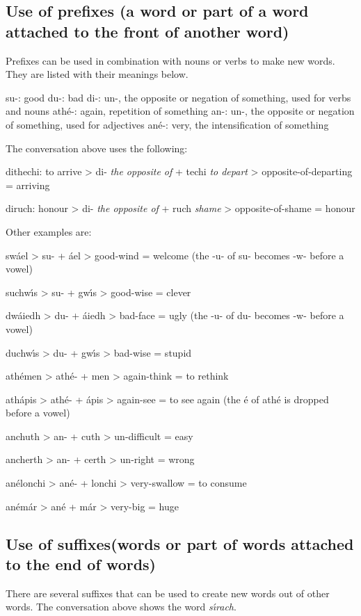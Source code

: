 \subsection{Use of prefixes (a word or part of a word attached to the front of another word)}

Prefixes can be used in combination with nouns or verbs to make new words. They are listed with their meanings below.

su-: good
du-: bad
di-: un-, the opposite or negation of something, used for verbs and nouns
ath\'{e}-: again, repetition of something
an-: un-, the opposite or negation of something, used for adjectives
an\'{e}-: very, the intensification of something

The conversation above uses the following:

dithechi: to arrive
> di- \textit{the opposite of} + techi \textit{to depart} > opposite-of-departing = arriving

diruch: honour
> di- \textit{the opposite of} + ruch \textit{shame} > opposite-of-shame = honour

Other examples are:

sw\'{a}el
> su- + \'{a}el > good-wind = welcome (the -u- of su- becomes -w- before a vowel)

suchw\'{\i}s
> su- + gw\'{\i}s > good-wise = clever

dw\'{a}iedh
> du- + \'{a}iedh > bad-face = ugly (the -u- of du- becomes -w- before a vowel)

duchw\'{\i}s
> du- + gw\'{\i}s > bad-wise = stupid

ath\'{e}men
> ath\'{e}- + men > again-think = to rethink

ath\'{a}pis
> ath\'{e}- + \'{a}pis > again-see = to see again (the \'{e} of ath\'{e} is dropped before a vowel)

anchuth
> an- + cuth > un-difficult = easy

ancherth
> an- + certh > un-right = wrong

an\'{e}lonchi
> an\'{e}- + lonchi > very-swallow = to consume

an\'{e}m\'{a}r
> an\'{e} + m\'{a}r > very-big = huge

\subsection{Use of suffixes(words or part of words attached to the end of words)}

There are several suffixes that can be used to create new words out of other words. The conversation above shows the word \textit{s\'{\i}rach}.

